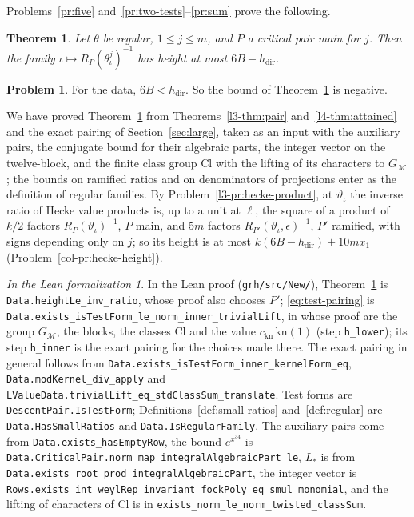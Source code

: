 \documentclass[reqno]{amsart}
\theoremstyle{definition}
\newtheorem{problem}{Problem}[section]
\theoremstyle{plain}
\newtheorem{theorem}{Theorem}[section]
\theoremstyle{remark}
\newtheorem*{leanremark}{In the Lean formalization}
\newcommand{\hdir}{h_{\mathrm{dir}}}
\newcommand{\Cl}{\mathrm{Cl}}
\newcommand{\Gm}{G_{\mathcal M}}
\newcommand{\tl}[1]{\texttt{#1}}
\begin{document}
Problems~\ref{pr:five} and~\ref{pr:two-tests}--\ref{pr:sum} prove the following.

\begin{theorem}\label{thm:main-pair}
Let \(\theta\) be regular, \(1 \le j \le m\), and \(P\) a critical pair main for \(j\).  Then the family \(\iota \mapsto R_P(\theta_\iota^j)^{-1}\) has height at most \(6B - \hdir\).
\end{theorem}

\begin{problem}\label{pr:negative}
For the data, \(6B < \hdir\).  So the bound of Theorem~\ref{thm:main-pair} is negative.
\end{problem}

We have proved Theorem~\ref{thm:main-pair} from Theorems~\ref{l3-thm:pair} and~\ref{l4-thm:attained} and the exact pairing of Section~\ref{sec:large}, taken as an input with the auxiliary pairs, the conjugate bound for their algebraic parts, the integer vector on the twelve-block, and the finite class group \(\Cl\) with the lifting of its characters to \(\Gm\); the bounds on ramified ratios and on denominators of projections enter as the definition of regular families.  By Problem~\ref{l3-pr:hecke-product}, at \(\vartheta_\iota\) the inverse ratio of Hecke value products is, up to a unit at \(\ell\), the square of a product of \(k/2\) factors \(R_P(\vartheta_\iota)^{-1}\), \(P\) main, and \(5m\) factors \(R_{P'}(\vartheta_\iota, \epsilon)^{-1}\), \(P'\) ramified, with signs depending only on \(j\); so its height is at most \(k(6B - \hdir) + 10mx_1\) (Problem~\ref{col-pr:hecke-height}).

\begin{leanremark}
\raggedright In the Lean proof \cite{GL} (\tl{grh/src/New/}), Theorem~\ref{thm:main-pair} is \tl{Data.heightLe\_inv\_ratio}, whose proof also chooses \(P'\); \eqref{eq:test-pairing} is \tl{Data.exists\_isTestForm\_le\_norm\_inner\_trivialLift}, in whose proof are the group \(\Gm\), the blocks, the classes \(\Cl\) and the value \(c_{\mathrm{kn}}\,\mathrm{kn}(1)\) (step \tl{h\_lower}); its step \tl{h\_inner} is the exact pairing for the choices made there.  The exact pairing in general follows from \tl{Data.exists\_isTestForm\_inner\_kernelForm\_eq}, \tl{Data.modKernel\_div\_apply} and \tl{LValueData.trivialLift\_eq\_stdClassSum\_translate}.  Test forms are \tl{DescentPair.IsTestForm}; Definitions~\ref{def:small-ratios} and~\ref{def:regular} are \tl{Data.HasSmallRatios} and \tl{Data.IsRegularFamily}.  The auxiliary pairs come from \tl{Data.exists\_hasEmptyRow}, the bound \(e^{x^{34}}\) is \tl{Data.CriticalPair.norm\_map\_integralAlgebraicPart\_le}, \(L_*\) is from \tl{Data.exists\_root\_prod\_integralAlgebraicPart}, the integer vector is \tl{Rows.exists\_int\_weylRep\_invariant\_fockPoly\_eq\_smul\_monomial}, and the lifting of characters of \(\Cl\) is in \tl{exists\_norm\_le\_norm\_twisted\_classSum}.
\end{leanremark}
\end{document}
